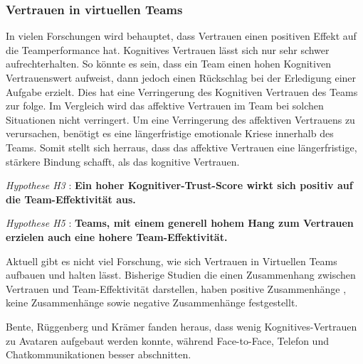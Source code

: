 \documentclass[a4paper,11pt]{article}%
\renewcommand{\\}{\vspace*{0.5\baselineskip} \newline}
\begin{document}

	\subsubsection{Vertrauen in virtuellen Teams}


In vielen Forschungen wird behauptet, dass Vertrauen einen positiven Effekt auf die Teamperformance hat. \citep{mcallister1995affect} \citep{mayer1995integrative} \citep{dirks2002trust}
Kognitives Vertrauen lässt sich nur sehr schwer aufrechterhalten. So könnte es sein, dass ein Team einen hohen Kognitiven Vertrauenswert aufweist, dann jedoch einen Rückschlag bei der Erledigung einer Aufgabe erzielt. Dies hat eine Verringerung des Kognitiven Vertrauen des Teams zur folge. \citep[p.29-31]{mcallister1995affect}
Im Vergleich wird das affektive Vertrauen im Team bei solchen Situationen nicht verringert. Um eine Verringerung des affektiven Vertrauens zu verursachen, benötigt es eine längerfristige emotionale Kriese innerhalb des Teams. Somit stellt sich herraus, dass das affektive Vertrauen eine längerfristige, stärkere Bindung schafft, als das kognitive Vertrauen.  \citep[p.29-31]{mcallister1995affect} \\

\textit{Hypothese H3} : \textbf{Ein hoher Kognitiver-Trust-Score wirkt sich positiv auf die Team-Effektivität aus.}\\

\textit{Hypothese H5} : \textbf{Teams, mit einem generell hohem Hang zum Vertrauen erzielen auch eine hohere Team-Effektivität.}

Aktuell gibt es nicht viel Forschung, wie sich Vertrauen in Virtuellen Teams aufbauen und halten lässt. \citep[p.8-23]{duarte2006mastering} 
Bisherige Studien die einen Zusammenhang zwischen Vertrauen und Team-Effektivität darstellen, haben positive Zusammenhänge \citep{davis2000trusted}, keine Zusammenhänge \citep{hertel2004managing} sowie negative Zusammenhänge \citep{dirks1999effects} festgestellt.

Bente, Rüggenberg und Krämer fanden heraus, dass wenig Kognitives-Vertrauen zu Avataren aufgebaut werden konnte, während Face-to-Face, Telefon und Chatkommunikationen besser abschnitten. \citep[p.54-59]{bente2004social}
\end{document}
